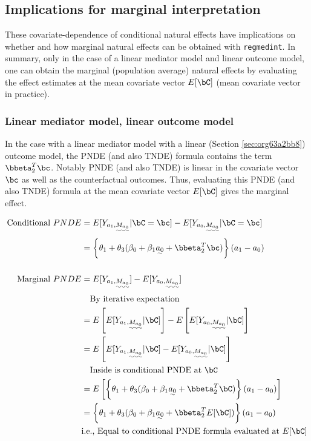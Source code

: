 \documentclass[10pt]{article}
\begin{document}
\subsection{Implications for marginal interpretation}
\label{sec:orgf66aef4}
These covariate-dependence of conditional natural effects have implications on whether and how marginal natural effects can be obtained with \texttt{regmedint}. In summary, only in the case of a linear mediator model and linear outcome model, one can obtain the marginal (population average) natural effects by evaluating the effect estimates at the mean covariate vector \(E[\bC]\) (mean covariate vector in practice).

\subsubsection{Linear mediator model, linear outcome model}
\label{sec:org3808ddb}
In the case with a linear mediator model with a linear (Section \ref{sec:org63a2bb8}) outcome model, the PNDE (and also TNDE) formula contains the term \(\bbeta_{2}^{T}\bc\). Notably PNDE (and also TNDE) is linear in the covariate vector \(\bc\) as well as the counterfactual outcomes. Thus, evaluating this PNDE (and also TNDE) formula at the mean covariate vector \(E[\bC]\) gives the marginal effect.

\begin{align*}
  \text{Conditional }PNDE
  &= E[Y_{a_{1},\uwave{M_{a_{0}}}} | \bC = \bc] - E[Y_{a_{0},\uwave{M_{a_{0}}}} | \bC = \bc]\\
  &= \left\{ \theta_{1} + \theta_{3}(\beta_{0} + \beta_{1}\uwave{a_{0}} + \bbeta_{2}^{T}\bc) \right\} (a_{1} - a_{0})\\
  \\
  \text{Marginal }PNDE
  &= E[Y_{a_{1},\uwave{M_{a_{0}}}}] - E[Y_{a_{0},\uwave{M_{a_{0}}}}]\\
  &~~~\text{By iterative expectation}\\
  &= E \left[ E[Y_{a_{1},\uwave{M_{a_{0}}}} | \bC] \right] -
     E \left[ E[Y_{a_{0},\uwave{M_{a_{0}}}} | \bC] \right]\\
  &= E \left[ E[Y_{a_{1},\uwave{M_{a_{0}}}} | \bC] - E[Y_{a_{0},\uwave{M_{a_{0}}}} | \bC] \right]\\
  &~~~\text{Inside is conditional PNDE at } \bC\\
  &= E\left[ \left\{ \theta_{1} + \theta_{3}(\beta_{0} + \beta_{1}\uwave{a_{0}} + \bbeta_{2}^{T}\bC) \right\} (a_{1} - a_{0}) \right]\\
  &= \left\{ \theta_{1} + \theta_{3}(\beta_{0} + \beta_{1}\uwave{a_{0}} + \bbeta_{2}^{T}E[\bC]) \right\} (a_{1} - a_{0})\\
  &\text{i.e., Equal to conditional PNDE formula evaluated at } E[\bC]\\
\end{align*}
\end{document}
